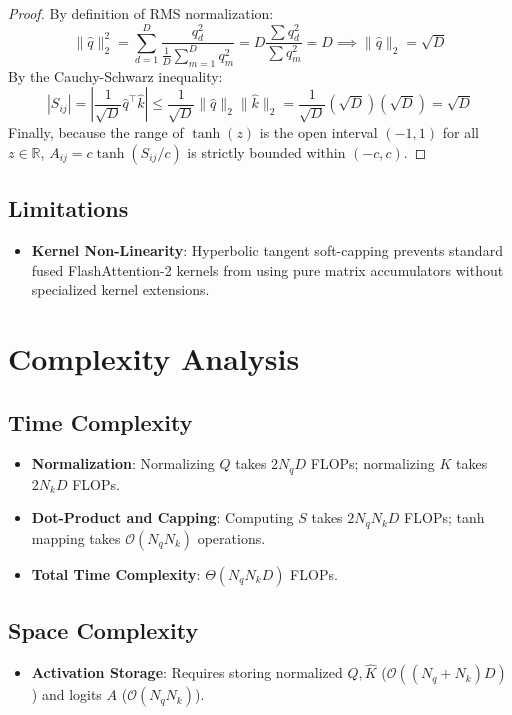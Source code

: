 \documentclass[11pt,a4paper]{article}
\theoremstyle{definition}
\begin{document}
\begin{proof}
By definition of RMS normalization:
\begin{equation}
\|\hat{q}\|_2^2 = \sum_{d=1}^D \frac{q_d^2}{\frac{1}{D} \sum_{m=1}^D q_m^2} = D \frac{\sum q_d^2}{\sum q_m^2} = D \implies \|\hat{q}\|_2 = \sqrt{D}
\end{equation}
By the Cauchy-Schwarz inequality:
\begin{equation}
|S_{ij}| = \left| \frac{1}{\sqrt{D}} \hat{q}^\top \hat{k} \right| \le \frac{1}{\sqrt{D}} \|\hat{q}\|_2 \|\hat{k}\|_2 = \frac{1}{\sqrt{D}} (\sqrt{D})(\sqrt{D}) = \sqrt{D}
\end{equation}
Finally, because the range of $\tanh(z)$ is the open interval $(-1, 1)$ for all $z \in \mathbb{R}$, $A_{ij} = c \tanh(S_{ij}/c)$ is strictly bounded within $(-c, c)$.
\end{proof}

\subsection{Limitations}
\begin{itemize}
    \item \textbf{Kernel Non-Linearity}: Hyperbolic tangent soft-capping prevents standard fused FlashAttention-2 kernels from using pure matrix accumulators without specialized kernel extensions.
\end{itemize}

\section{Complexity Analysis}

\subsection{Time Complexity}
\begin{itemize}
    \item \textbf{Normalization}: Normalizing $Q$ takes $2 N_q D$ FLOPs; normalizing $K$ takes $2 N_k D$ FLOPs.
    \item \textbf{Dot-Product and Capping}: Computing $S$ takes $2 N_q N_k D$ FLOPs; tanh mapping takes $\mathcal{O}(N_q N_k)$ operations.
    \item \textbf{Total Time Complexity}: $\Theta(N_q N_k D)$ FLOPs.
\end{itemize}

\subsection{Space Complexity}
\begin{itemize}
    \item \textbf{Activation Storage}: Requires storing normalized $\hat{Q}, \hat{K}$ ($\mathcal{O}((N_q + N_k)D)$) and logits $A$ ($\mathcal{O}(N_q N_k)$).
\end{itemize}
\end{document}
